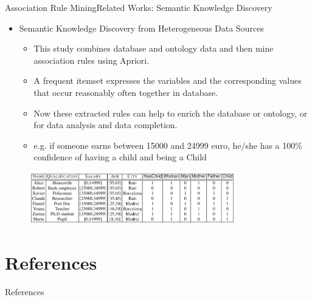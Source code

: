 \documentclass[10pt]{beamer}
\begin{document}
\begin{frame}{Association Rule Mining}{Related Works:  Semantic Knowledge Discovery}
\begin{itemize}
\item Semantic Knowledge Discovery from Heterogeneous Data Sources\cite{d2012semantic}
\begin{itemize}
\item This study combines database and ontology data and then mine association rules using Apriori.
\item A frequent itemset expresses the variables and the corresponding values that occur reasonably often together in database.
\item Now these extracted rules can help to enrich the database or ontology, or for data analysis and data completion.
\item e.g. if someone earns between 15000 and 24999 euro, he/she has a 100\% confidence of having a child and being a Child
\end{itemize}
\end{itemize}
\begin{figure}[H]
	\centering
	\includegraphics[width=0.8\textwidth]{images/Database.PNG}
	\label{fig:Database}
 
\end{figure}
\end{frame}


	
	



\section{References}
 \begin{frame}[allowframebreaks] {References}


 

\end{frame}

{\aauwavesbg%
\begin{frame}%
\end{frame}}
\end{document}
